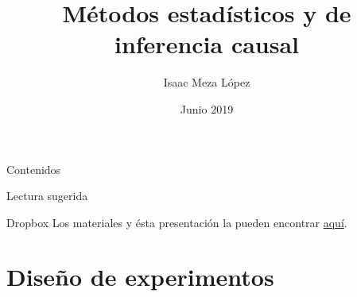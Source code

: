 \documentclass[8pt]{beamer}
\title{Métodos estadísticos y de inferencia causal}
\author{Isaac Meza López\inst{1}}
\institute[ITAM] %
{
  \inst{1}%
  ITAM
  
}
\date{Junio 2019}
\begin{document}
\begin{frame}
  \titlepage
\end{frame}

\begin{frame}[allowframebreaks]{Contenidos}
  \tableofcontents
\end{frame}

\nocite{*}
\begin{frame}[allowframebreaks]{Lectura sugerida}


\end{frame}

\begin{frame}{Dropbox}
    Los materiales y ésta presentación la pueden encontrar \color{blue}\href{https://www.dropbox.com/sh/tozs2f2dznc9c19/AAAjvhu9Vbl6ZT__iE4Remi9a?dl=0}{aquí}.
\end{frame}


\section{Diseño de experimentos}
\end{document}
